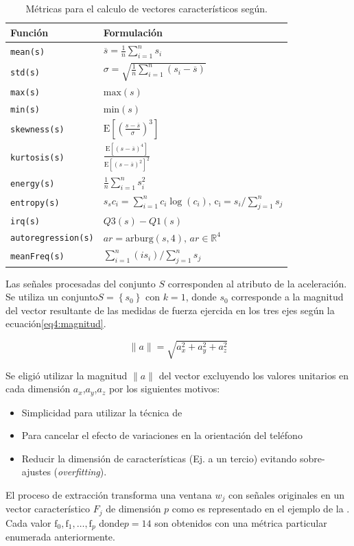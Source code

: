 \begin{table}[!tbph]
\begin{centering}
\begin{tabular}{|l|l|}
\hline 
Función & Formulación\tabularnewline
\hline 
\hline 
\texttt{mean(s)} & $\overline{s}=\frac{1}{n}\sum_{i=1}^{n}s_{i}$\tabularnewline
\hline 
\texttt{std(s)} & $\sigma=\sqrt{\frac{1}{n}\sum_{i=1}^{n}\left(s_{i}-\overline{s}\right)}$\tabularnewline
\hline 
\texttt{max(s)} & $\mathrm{max}(s)$\tabularnewline
\hline 
\texttt{min(s)} & $\mathrm{min}(s)$\tabularnewline
\hline 
\texttt{skewness(s)} & $\mathrm{E}\left[\left(\frac{s-\overline{s}}{\sigma}\right)^{3}\right]$\tabularnewline
\hline 
\texttt{kurtosis(s)} & $\frac{\mathrm{E}\left[\left(s-\overline{s}\right)^{4}\right]}{\mathrm{E}\left[\left(s-\overline{s}\right)^{2}\right]^{2}}$\tabularnewline
\hline 
\texttt{energy(s)} & $\frac{1}{n}\sum_{i=1}^{n}s_{i}^{2}$\tabularnewline
\hline 
\texttt{entropy(s)} & $s_{s}c_{i}=\sum_{i=1}^{n}c_{i}\log\left(c_{i}\right)\mathrm{\mathtt{\mathrm{,}}\,c_{i}}=s_{i}/\sum_{j=1}^{n}s_{j}$\tabularnewline
\hline 
\texttt{irq(s)} & $Q3(s)-Q1(s)$\tabularnewline
\hline 
\texttt{autoregression(s)} & $ar=\mathrm{arburg}\left(s,4\right)\mathrm{,}\,ar\in\mathbb{R}^{4}$\tabularnewline
\hline 
\texttt{meanFreq(s)} & $\sum_{i=1}^{n}\left(is_{i}\right)/\sum_{j=1}^{n}s_{j}$\tabularnewline
\hline 
\end{tabular}
\par\end{centering}
\caption[Métricas de valores característicos]{\label{tab4:metricas}Métricas para el calculo de vectores característicos
según\cite{ReyesOrtiz2015}.}
\end{table}

Las señales procesadas del conjunto $S$ corresponden al atributo
de la aceleración. Se utiliza un conjunto$S=\left\{ s_{0}\right\} $
con $k=1$, donde $s_{0}$ corresponde a la magnitud del vector resultante
de las medidas de fuerza ejercida en los tres ejes según la ecuación\ref{eq4:magnitud}.

\begin{equation}
\lVert a\rVert=\sqrt{a_{x}^{2}+a_{y}^{2}+a_{z}^{2}}\label{eq4:magnitud}
\end{equation}

Se eligió utilizar la magnitud $\lVert a\rVert$ del vector excluyendo
los valores unitarios en cada dimensión $a_{x}$,$a_{y}$,$a_{z}$
por los siguientes motivos:
\begin{itemize}
\item Simplicidad para utilizar la técnica de
\item Para cancelar el efecto de variaciones en la orientación del teléfono\cite{Schneider2014}
\item Reducir la dimensión de características (Ej. a un tercio) evitando
sobre-ajustes (\emph{overfitting}).
\end{itemize}
El proceso de extracción transforma una ventana $w_{j}$ con señales
originales en un vector característico $F_{j}$ de dimensión $p$
como es representado en el ejemplo de la .
Cada valor $\mathrm{f}_{0},\mathrm{f}_{1},\ldots,\mathrm{f}_{p}$
donde$p=14$ son obtenidos con una métrica particular enumerada anteriormente.

